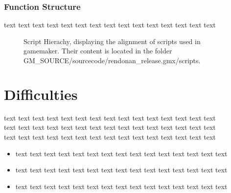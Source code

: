 \documentclass[12pt]{report}
\begin{document}
\subsubsection{Function Structure}
text text text text text text text text text text text text text text text\\
\begin{figure}[h]
\caption{Script Hierachy, displaying the alignment of scripts used in gamemaker. Their content is located in the folder GM\_SOURCE/sourcecode/rendonan\_release.gmx/scripts.}
\end{figure}

\section*{Difficulties}
text text text text text text text text text text text text text text text\\text text text text text text text text text text text text text text text\\text text text text text text text text text text text text text text text\\
\begin{itemize}
\item text text text text text text text text text text text text text text text\\
\item text text text text text text text text text text text text text text text\\
\item text text text text text text text text text text text text text text text\\
\end{itemize}
\end{document}
